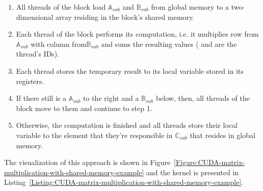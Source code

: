 \begin{enumerate}
	\item All threads of the block load $ \mathbb{A}_{sub} $ and $ \mathbb{B}_{sub} $ from global memory to a two-dimensional array residing in the block's shared memory.
	\item Each thread of the block performs its computation, i.e. it multiplies row  from\space $ \mathbb{A}_{sub} $ with column  from$ \mathbb{B}_{sub} $ and sums the resulting values ( and  are the thread's IDs).
	\item Each thread stores the temporary result to its local variable  stored in its registers.
	\item If there still is a $ \mathbb{A}_{sub} $ to the right and a $ \mathbb{B}_{sub} $ below, then, all threads of the block move to them and continue to step 1.
	\item Otherwise, the computation is finished and all threads store their local variable  to the element that they're responsible  in $ \mathbb{C}_{sub} $ that resides in global memory.
\end{enumerate}

The visualization of this approach is shown in Figure~\ref{Figure:CUDA-matrix-multiplication-with-shared-memory-example} and the kernel is presented in Listing~\ref{Listing:CUDA-matrix-multiplication-with-shared-memory-example}.

